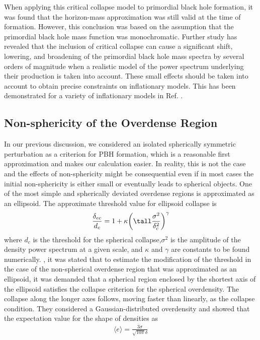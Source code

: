 When applying this critical collapse model to primordial black hole formation, it was found that the horizon-mass approximation was still valid at the time of formation. However, this conclusion was based on the assumption that the primordial black hole mass function was monochromatic. Further study has revealed that the inclusion of critical collapse can cause a significant shift, lowering, and broadening of the primordial black hole mass spectra by several orders of magnitude when a realistic model of the power spectrum underlying their production is taken into account. These small effects should be taken into account to obtain precise constraints on inflationary models. This has been demonstrated for a variety of inflationary models in Ref. \cite{K_hnel_2016}.
\subsection{Non-sphericity of the Overdense Region}
In our previous discussion, we considered an isolated spherically symmetric perturbation as a criterion for PBH formation, which is a reasonable first approximation and makes our calculation easier. In reality, this is not the case and the effects of non-sphericity might be consequential even if in most cases the initial non-sphericity is either small or eventually leads to spherical objects. One of the most simple and spherically deviated overdense regions is approximated as an ellipsoid. The approximate threshold value for ellipsoid collapse is 
\begin{align}
    \frac{\delta_{ec}}{d_c} = 1 + \kappa \qty(\tall \frac{\sigma^2}{\delta_{c}^2})^{\gamma} \label{3.48}
\end{align}
where $d_c$ is the threshold for the spherical collapse,$\sigma^2$ is the amplitude of the density power spectrum at a given scale, and $\kappa$ and $\gamma$ are constants to be found numerically.
\cite{Kuhnel:2016exn}, it was stated that to estimate the modification of the threshold in the case of the non-spherical overdense region that was approximated as an ellipsoid, it was demanded that a spherical region enclosed by the shortest axis of the ellipsoid satisfies the collapse criterion for the spherical overdensity. The collapse along the longer axes follows, moving faster than linearly, as the collapse condition. They considered a Gaussian-distributed overdensity and showed that the expectation value for the shape of densities as
\begin{align}
    \langle e \rangle = \frac{3\sigma}{\sqrt{10\pi} \delta}\label{3.49}
\end{align}
